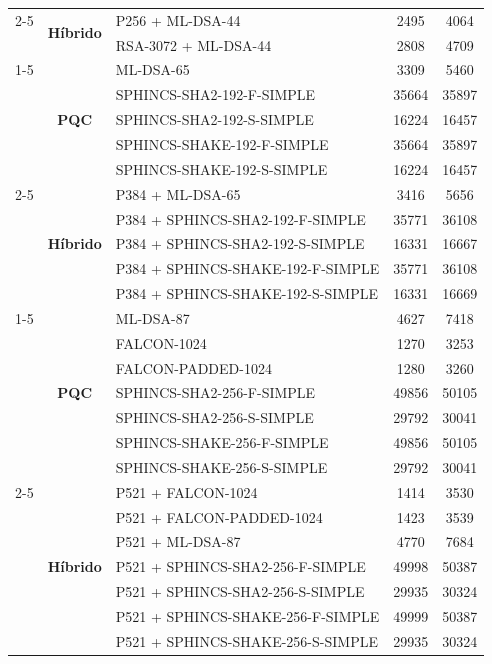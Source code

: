 \documentclass[10pt]{article}
\begin{document}
\begin{tabular}{@{}c c l c c@{}}
\cmidrule(lr){2-5}
 & \multirow[c]{2}{*}{\textbf{Híbrido}} & P256 + ML-DSA-44 & 2495 & 4064 \\
 &  & RSA-3072 + ML-DSA-44 & 2808 & 4709 \\
\cmidrule(lr){1-5}
\multirow[c]{10}{*}{\textbf{III}} & \multirow[c]{5}{*}{\textbf{PQC}} & ML-DSA-65 & 3309 & 5460 \\
 &  & SPHINCS-SHA2-192-F-SIMPLE & 35664 & 35897 \\
 &  & SPHINCS-SHA2-192-S-SIMPLE & 16224 & 16457 \\
 &  & SPHINCS-SHAKE-192-F-SIMPLE & 35664 & 35897 \\
 &  & SPHINCS-SHAKE-192-S-SIMPLE & 16224 & 16457 \\
\cmidrule(lr){2-5}
 & \multirow[c]{5}{*}{\textbf{Híbrido}} & P384 + ML-DSA-65 & 3416 & 5656 \\
 &  & P384 + SPHINCS-SHA2-192-F-SIMPLE & 35771 & 36108 \\
 &  & P384 + SPHINCS-SHA2-192-S-SIMPLE & 16331 & 16667 \\
 &  & P384 + SPHINCS-SHAKE-192-F-SIMPLE & 35771 & 36108 \\
 &  & P384 + SPHINCS-SHAKE-192-S-SIMPLE & 16331 & 16669 \\
\cmidrule(lr){1-5}
\multirow[c]{14}{*}{\textbf{V}} & \multirow[c]{7}{*}{\textbf{PQC}} & ML-DSA-87 & 4627 & 7418 \\
 &  & FALCON-1024 & 1270 & 3253 \\
 &  & FALCON-PADDED-1024 & 1280 & 3260 \\
 &  & SPHINCS-SHA2-256-F-SIMPLE & 49856 & 50105 \\
 &  & SPHINCS-SHA2-256-S-SIMPLE & 29792 & 30041 \\
 &  & SPHINCS-SHAKE-256-F-SIMPLE & 49856 & 50105 \\
 &  & SPHINCS-SHAKE-256-S-SIMPLE & 29792 & 30041 \\
\cmidrule(lr){2-5}
 & \multirow[c]{7}{*}{\textbf{Híbrido}} & P521 + FALCON-1024 & 1414 & 3530 \\
 &  & P521 + FALCON-PADDED-1024 & 1423 & 3539 \\
 &  & P521 + ML-DSA-87 & 4770 & 7684 \\
 &  & P521 + SPHINCS-SHA2-256-F-SIMPLE & 49998 & 50387 \\
 &  & P521 + SPHINCS-SHA2-256-S-SIMPLE & 29935 & 30324 \\
 &  & P521 + SPHINCS-SHAKE-256-F-SIMPLE & 49999 & 50387 \\
 &  & P521 + SPHINCS-SHAKE-256-S-SIMPLE & 29935 & 30324 \\
\bottomrule
\end{tabular}
\end{document}
